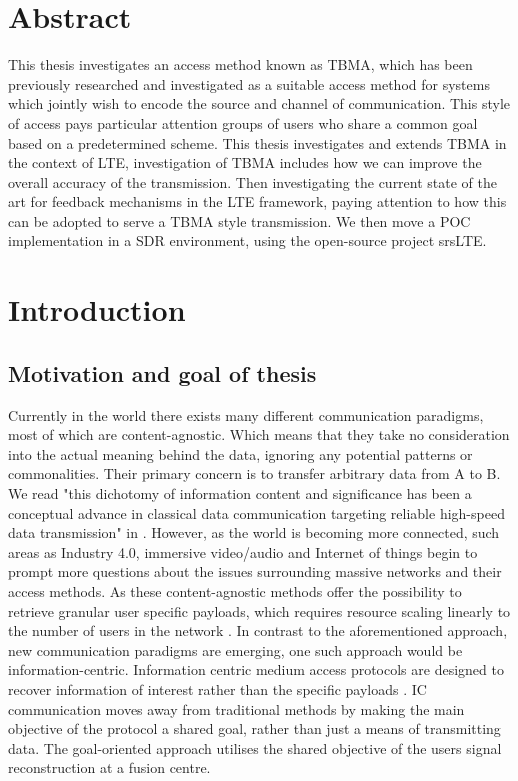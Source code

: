 \documentclass{article}
\begin{document}
\newpage

\section*{Abstract}
This thesis investigates an access method known as \ac{TBMA}, which has been previously researched and investigated as a suitable access method for systems which jointly wish to encode the source and channel of communication. This style of access pays particular attention groups of users who share a common goal based on a predetermined scheme. This thesis investigates and extends \ac{TBMA} in the context of LTE, investigation of \ac{TBMA} includes how we can improve the overall accuracy of the transmission. Then investigating the current state of the art for feedback mechanisms in the LTE framework, paying attention to how this can be adopted to serve a \ac{TBMA} style transmission. We then move a \ac{POC} implementation in a \ac{SDR} environment, using the open-source project srsLTE. 
\newpage

\section{Introduction}\label{intro}
\subsection{Motivation and goal of thesis}

Currently in the world there exists many different communication paradigms, most of which are content-agnostic. Which means that they take no consideration into the actual meaning behind the data, ignoring any potential patterns or commonalities. Their primary concern is to transfer arbitrary data from A to B. We read "this dichotomy of information content and significance has been a conceptual advance in classical data communication targeting reliable high-speed data transmission" in \cite{kountouris}. 
However, as the world is becoming more connected, such areas as Industry 4.0, immersive video/audio and Internet of things begin to prompt more questions about the issues surrounding massive networks and their access methods. As these content-agnostic methods offer the possibility to retrieve granular user specific payloads, which requires resource scaling linearly to the number of users in the network \cite{aloha,graphbased_analysis,coded_ran,capacity_gauss}. In contrast to the aforementioned approach, new communication paradigms are emerging, one such approach would be information-centric. Information centric  medium access protocols are designed to recover information of interest rather than the specific payloads \cite{kountouris,sem_coms,sem_filter,source_chane_coding,source_chane_coding2}. \ac{IC} communication moves away from traditional methods by making the main objective of the protocol a shared goal, rather than just a means of transmitting data. The goal-oriented approach utilises the shared objective of the users signal reconstruction at a fusion centre. 
\end{document}
